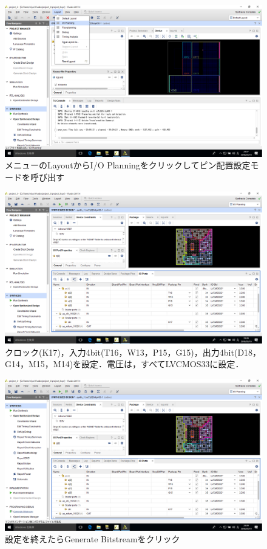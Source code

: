\documentclass[a4paper,dvipdfmx]{jsarticle}
\begin{document}
 \begin{figure}[H]
  \begin{center}
   \includegraphics[width=.8\textwidth]{chapter08_figures/VirtualBox_Windows10_19_03_2018_23_37_20.png}
  \end{center}
  \caption{メニューのLayoutからI/O Planningをクリックしてピン配置設定モードを呼び出す}
 \end{figure}

 \begin{figure}[H]
  \begin{center}
   \includegraphics[width=.8\textwidth]{chapter08_figures/VirtualBox_Windows10_19_03_2018_23_39_38.png}
  \end{center}
  \caption{クロック(K17)，入力4bit(T16，W13，P15，G15)，出力4bit(D18，G14，M15，M14)を設定．電圧は，すべてLVCMOS33に設定．}
 \end{figure}

 \begin{figure}[H]
  \begin{center}
   \includegraphics[width=.8\textwidth]{chapter08_figures/VirtualBox_Windows10_19_03_2018_23_39_45.png}
  \end{center}
  \caption{設定を終えたらGenerate Bitstreamをクリック}
 \end{figure}
\end{document}
